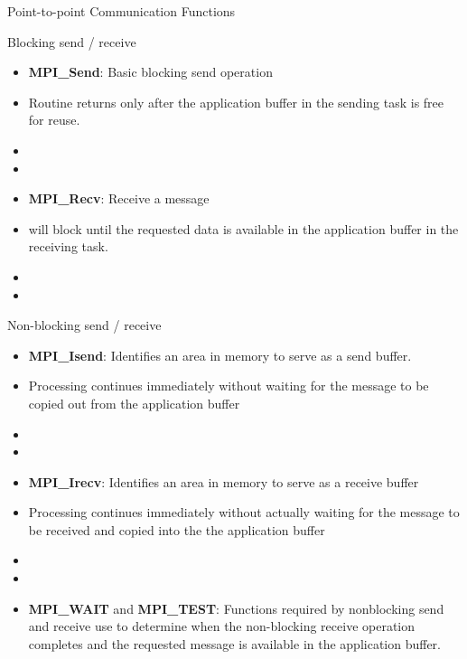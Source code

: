 \documentclass[9pt,c]{beamer}
\begin{document}
\begin{frame}{Point-to-point Communication Functions}
  \begin{block}{Blocking send / receive}
    \begin{itemize}
      \item \textbf{MPI\_Send}: Basic blocking send operation
      \item Routine returns only after the application buffer in the sending task is free for reuse.
      \item[] 
      \item[] 
    \end{itemize}

    \begin{itemize}
      \item \textbf{MPI\_Recv}: Receive a message 
      \item will block until the requested data is available in the application buffer in the receiving task.
      \item[] 
      \item[] 
    \end{itemize}
  \end{block}

  \framebreak

  \begin{block}{Non-blocking send / receive}
    \begin{itemize}
      \item \textbf{MPI\_Isend}: Identifies an area in memory to serve as a send buffer.
      \item Processing continues immediately without waiting for the message to be copied out from the application buffer
      \item[] 
      \item[] 
      \item \textbf{MPI\_Irecv}: Identifies an area in memory to serve as a receive buffer
      \item Processing continues immediately without actually waiting for the message to be received and copied into the the application buffer
      \item[] 
      \item[] 
      \item \textbf{MPI\_WAIT} and \textbf{MPI\_TEST}: Functions required by nonblocking send and receive use to determine when the non-blocking receive operation completes and the requested message is available in the application buffer.
    \end{itemize}
  \end{block}
\end{frame}
\end{document}
